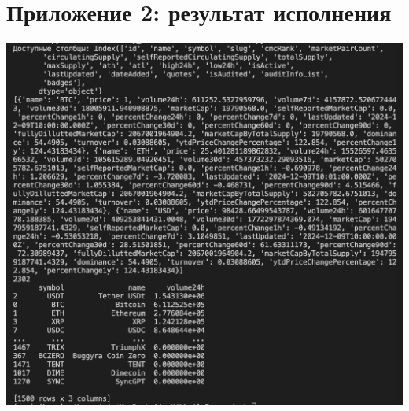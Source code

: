 \documentclass[12pt]{article}
\theoremstyle{indented}
\theoremstyle{definition}
\theoremstyle{remark}
\begin{document}
\section*{Приложение 2: результат исполнения}
\begin{center}
    \includegraphics[width = 1.0\textwidth]{output.png}
\end{center}
\end{document}
